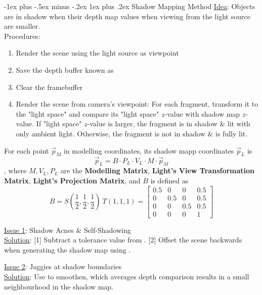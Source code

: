 \documentclass[10pt,landscape,letterpaper]{article}
\makeatletter
\renewcommand{\subsubsection}{\@startsection{subsubsection}{3}{0mm}%
                                {-1ex plus -.5ex minus -.2ex}%
                                {1ex plus .2ex}%
                                {\normalfont\small\itshape}}
\makeatother
\begin{document}
\begin{multicols}{3}
\subsubsection{Shadow Mapping Method}
\underline{Idea}: Objects are in shadow when their depth map values when viewing from the light source are smaller.
\\
Procedures:
\begin{enumerate}
	\item Render the scene using the light source as viewpoint
	\item Save the depth buffer known as 
	\item Clear the framebuffer
	\item Render the scene from camera’s viewpoint: For each fragment, transform it to the "light space" and compare its "light space" $z$-value with shadow map $z$-value.
	If "light space" $z$-value is larger, the fragment is in shadow \& lit with only ambient light. Otherwise, the fragment is not in shadow \& is fully lit.
\end{enumerate}

For each point $\vec{p}_M$ in modelling coordinates, its shadow mapp coordinates $\vec{p}_L$ is
\[
\vec{p}_L = B \cdot P_L \cdot V_L \cdot M \cdot \vec{p}_M
\]
, where $M, V_L, P_L$ are the \textbf{Modelling Matrix}, \textbf{Light's View Transformation Matrix}, \textbf{Light's Projection Matrix}, and $B$ is defined as
\[
B = S(\frac{1}{2}, \frac{1}{2}, \frac{1}{2}) \ T(1, 1, 1) = \begin{bmatrix}
	0.5 	& 0 	& 0		& 0.5 \\
	0	 	 & 0.5 	& 0		& 0.5 \\
	0        & 0 	 & 0.5	& 0.5 \\
	0 		 & 0 	& 0		& 1
\end{bmatrix}
\]

\underline{Issue 1}: Shadow Acnes \& Self-Shadowing
\\
\underline{Solution}:  [1] Subtract a tolerance value from . [2] Offset the scene backwards when generating the shadow map using .

\smallskip

\underline{Issue 2}: Jaggies at shadow boundaries
\\
\underline{Solution}: Use  to smoothen, which averages depth comparison results in a small neighbourhood in the shadow map.






\end{multicols}
\end{document}
